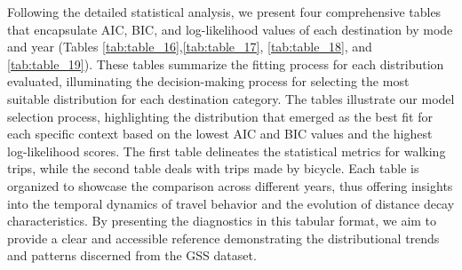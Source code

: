 \documentclass[12pt,twoside]{reedthesis}
\begin{document}
Following the detailed statistical analysis, we present four comprehensive tables that encapsulate AIC, BIC, and log-likelihood values of each destination by mode and year (Tables \ref{tab:table_16},\ref{tab:table_17}, \ref{tab:table_18}, and \ref{tab:table_19}). These tables summarize the fitting process for each distribution evaluated, illuminating the decision-making process for selecting the most suitable distribution for each destination category. The tables illustrate our model selection process, highlighting the distribution that emerged as the best fit for each specific context based on the lowest AIC and BIC values and the highest log-likelihood scores. The first table delineates the statistical metrics for walking trips, while the second table deals with trips made by bicycle. Each table is organized to showcase the comparison across different years, thus offering insights into the temporal dynamics of travel behavior and the evolution of distance decay characteristics. By presenting the diagnostics in this tabular format, we aim to provide a clear and accessible reference demonstrating the distributional trends and patterns discerned from the GSS dataset.
\end{document}
